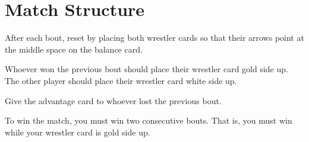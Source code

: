 \section*{Match Structure}
After each bout, reset by placing both wrestler cards so that their arrows point at the middle space on the balance card.

Whoever won the previous bout should place their wrestler card gold side up. The other player should place their wrestler card white side up.

Give the advantage card to whoever lost the previous bout.


To win the match, you must win two consecutive bouts. That is, you must win while your wrestler card is gold side up.


